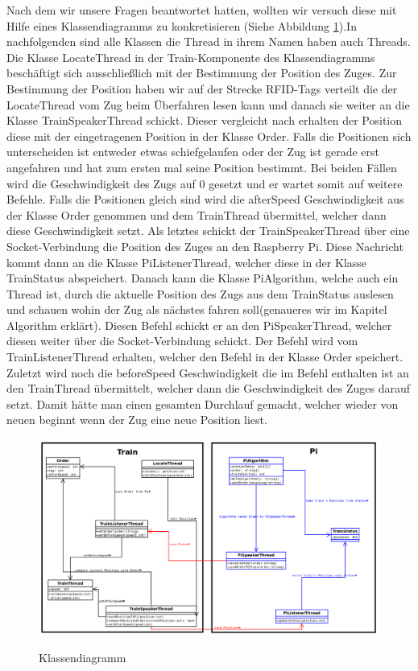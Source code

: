 Nach dem wir unsere Fragen beantwortet hatten, wollten wir versuch diese mit Hilfe eines Klassendiagramms zu konkretisieren (Siehe Abbildung \ref{pic:ClassDiagram}).In nachfolgenden sind alle Klassen die Thread in ihrem Namen haben auch Threads. Die Klasse LocateThread in der Train-Komponente des Klassendiagramms beschäftigt sich ausschließlich mit der Bestimmung der Position des Zuges. Zur Bestimmung der Position  haben wir auf der Strecke RFID-Tags verteilt die der LocateThread vom Zug beim Überfahren lesen kann und danach sie weiter an die Klasse TrainSpeakerThread schickt. Dieser vergleicht nach erhalten der Position diese mit der eingetragenen Position in der Klasse Order. Falls die Positionen sich unterscheiden ist entweder etwas schiefgelaufen oder der Zug ist gerade erst angefahren und hat zum ersten mal seine Position bestimmt. Bei beiden Fällen wird die Geschwindigkeit des Zugs auf 0 gesetzt und er wartet somit auf weitere Befehle. Falls die Positionen gleich sind wird die afterSpeed Geschwindigkeit aus der Klasse Order genommen und dem TrainThread übermittel, welcher dann diese Geschwindigkeit setzt. Als letztes schickt der TrainSpeakerThread über eine Socket-Verbindung die Position des Zuges an den Raspberry Pi. Diese Nachricht kommt dann an die Klasse PiListenerThread, welcher diese in der Klasse TrainStatus abspeichert. Danach kann die Klasse PiAlgorithm, welche auch ein Thread ist, durch die aktuelle Position des Zugs aus dem TrainStatus auslesen und schauen wohin der Zug als nächstes fahren soll(genaueres wir im Kapitel Algorithm erklärt). Diesen Befehl schickt er an den PiSpeakerThread, welcher diesen weiter über die Socket-Verbindung schickt. Der Befehl wird vom TrainListenerThread erhalten, welcher den Befehl in der Klasse Order speichert. Zuletzt wird noch die beforeSpeed Geschwindigkeit die im Befehl enthalten ist an den TrainThread übermittelt, welcher dann die Geschwindigkeit des Zuges darauf setzt. Damit hätte man einen gesamten Durchlauf gemacht, welcher wieder von neuen beginnt wenn der Zug eine neue Position liest.  


\begin{figure}[H]	
\caption{Klassendiagramm}
\includegraphics[width=2\textwidth, width=465pt]{content/images/ClassDiagram.png}
\label{pic:ClassDiagram}
\end{figure}



